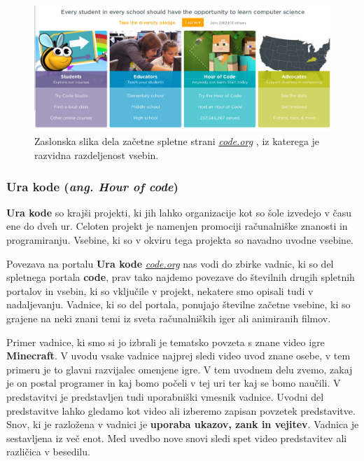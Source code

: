 \begin{figure}[h!]
    \includegraphics [width=1\linewidth, keepaspectratio =
    1] {./images/sc_web/code_main_part-v01.jpg}
    \caption{Zaslonska slika dela začetne spletne strani
      \emph{\href{https://www.code.org}{code.org}}
      \cite{web:code.org}, iz katerega je razvidna razdeljenost
      vsebin.}
    \label{fig:scr:web:code:main}
\end{figure}

\subsubsection{Ura kode (\emph{ang. Hour of code})}
\label{sec:ura-kode-ang}

\textbf{Ura kode} so krajši projekti, ki jih lahko organizacije kot so
šole izvedejo v času ene do dveh ur. Celoten projekt je namenjen
promociji računalniške znanosti in programiranju. Vsebine, ki so v
okviru tega projekta so navadno uvodne vsebine.

Povezava na portalu \textbf{Ura kode}
\emph{\href{https://code.org}{code.org}} nas vodi do zbirke vadnic, ki
so del spletnega portala \textbf{code}, prav tako najdemo povezave do
številnih drugih spletnih portalov in vsebin, ki so vključile v
projekt, nekatere smo opisali tudi v nadaljevanju.  Vadnice, ki so
del portala, ponujajo številne začetne vsebine, ki so grajene na neki
znani temi iz sveta računalniških iger ali animiranih filmov.

Primer vadnice, ki smo si jo izbrali je tematsko povzeta s znane video
igre \textbf{Minecraft}. V uvodu vsake vadnice najprej sledi video
uvod znane osebe, v tem primeru je to glavni razvijalec omenjene
igre. V tem uvodnem delu zvemo, zakaj je on postal programer in kaj
bomo počeli v tej uri ter kaj se bomo naučili. V predstavitvi je
predstavljen tudi uporabniški vmesnik vadnice. Uvodni del predstavitve
lahko gledamo kot video ali izberemo zapisan povzetek
predstavitve. Snov, ki je razložena v vadnici je \textbf{uporaba
  ukazov, zank in vejitev}. Vadnica je sestavljena iz več enot. Med
uvedbo nove snovi sledi spet video predstavitev ali različica v
besedilu.

